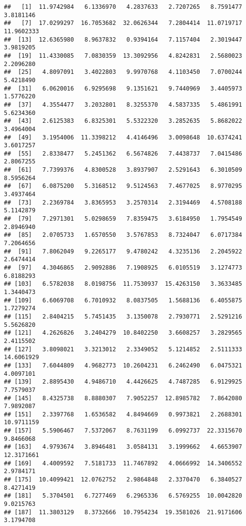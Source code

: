 \documentclass[
]{article}
\begin{document}
\begin{verbatim}
##   [1]  11.9742984   6.1336970   4.2837633   2.7207265   8.7591477   3.8181146
##   [7]  17.0299297  16.7053682  32.0626344   7.2804414  11.0719717  11.9602333
##  [13]  12.6365980   8.9637832   0.9394164   7.1157404   2.3019447   3.9819205
##  [19]  11.4330085   7.0830359  13.3092956   4.8242831   2.5680023   2.2096280
##  [25]   4.8097091   3.4022803   9.9970768   4.1103450   7.0700244   5.4218490
##  [31]   6.0620016   6.9295698   9.1351621   9.7440969   3.4405973   1.5776220
##  [37]   4.3554477   3.2032801   8.3255370   4.5837335   5.4861991   5.6234360
##  [43]   2.6125383   6.8325301   5.5322320   3.2852635   5.8682022   3.4964004
##  [49]   3.1954006  11.3398212   4.4146496   3.0098648  10.6374241   3.6017257
##  [55]   2.8338477   5.2451362   6.5674826   7.4438737   7.0415486   2.8067255
##  [61]   7.7399376   4.8300528   3.8937907   2.5291643   6.3010509   8.5956264
##  [67]   6.0875200   5.3168512   9.5124563   7.4677025   8.9770295   3.4937464
##  [73]   2.2369784   3.8365953   3.2570314   2.3194469   4.5708188   5.1142879
##  [79]   7.2971301   5.0298659   7.8359475   3.6184950   1.7954549   2.8946940
##  [85]   2.0705733   1.6570550   3.5767853   8.7324047   6.0717384   7.2064656
##  [91]   7.8062049   9.2265177   9.4780242   4.3235136   2.2045922   2.6474414
##  [97]   4.3046865   2.9092886   7.1908925   6.0105519   3.1274773   6.8188293
## [103]   6.5782038   8.0198756  11.7530937  15.4263150   3.3633485   1.3440473
## [109]   6.6069708   6.7010932   8.0837505   1.5688136   6.4055875   1.7279274
## [115]   2.8404215   5.7451435   3.1350078   2.7930771   2.5291216   5.5626820
## [121]   4.2626826   3.2404279  10.8402250   3.6608257   3.2829565   2.4115502
## [127]   3.8098021   3.3213012   2.3349052   5.1214852   2.5111333  14.6061929
## [133]   7.6044809   4.9682773  10.2604231   6.2462490   6.0475321   4.0097101
## [139]   2.8895430   4.9486710   4.4426625   4.7487285   6.9129925   7.7579037
## [145]   8.4325738   8.8880307   7.9052257  12.8985782   7.8642080   7.9892087
## [151]   2.3397768   1.6536582   4.8494669   0.9973821   2.2688301  10.9711159
## [157]   5.5906467   7.5372067   8.7631199   6.0992737  22.3315670   9.8466068
## [163]   4.9793674   3.8946481   3.0584131   3.1999662   4.6653907  12.3171661
## [169]   4.4009592   7.5181733  11.7467892   4.0666992  14.3406552   2.9784171
## [175]  10.4099421  12.0762752   2.9864848   2.3370470   6.3840527   8.4271419
## [181]   5.3704501   6.7277469   6.2965336   6.5769255  10.0042820   9.0215763
## [187]  11.3803129   8.3732666  10.7954234  19.3581026  21.9171606   3.1794708

\end{verbatim}
\end{document}
